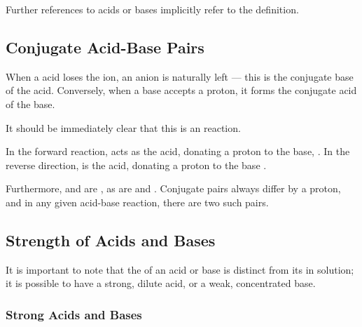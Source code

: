 			Further references to acids or bases implicitly refer to the  definition.




		\pagebreak
		\subsection{Conjugate Acid-Base Pairs}

			When a acid loses the  ion, an anion is naturally left --- this is the conjugate base of the acid. Conversely, when a
			base accepts a proton, it forms the conjugate acid of the base.


			It should be immediately clear that this is an  reaction.

			In the forward reaction,  acts as the acid, donating a proton to the base, . In the reverse direction,
			 is the acid, donating a proton to the base .

			 Furthermore,  and  are , as are  and . Conjugate pairs always
			 differ by a proton, and in any given acid-base reaction, there are two such pairs.



		\subsection{Strength of Acids and Bases}

			It is important to note that the  of an acid or base is distinct from its  in solution;
			it is possible to have a strong, dilute acid, or a weak, concentrated base.

			\subsubsection{Strong Acids and Bases}

